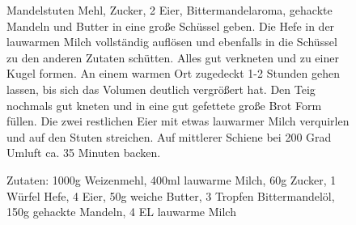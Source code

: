 \begin{figure}
Mandelstuten
Mehl, Zucker, 2 Eier, Bittermandelaroma, gehackte Mandeln und Butter in eine große Schüssel geben.
Die Hefe in der lauwarmen Milch vollständig auflösen und ebenfalls in die Schüssel zu den anderen Zutaten schütten. Alles gut verkneten und zu einer Kugel formen.
An einem warmen Ort zugedeckt 1-2 Stunden gehen lassen, bis sich das Volumen deutlich vergrößert hat.
Den Teig nochmals gut kneten und in eine gut gefettete große Brot Form füllen.
Die zwei restlichen Eier mit etwas lauwarmer Milch verquirlen und auf den Stuten streichen.
Auf mittlerer Schiene bei 200 Grad Umluft ca. 35 Minuten backen.

Zutaten: 1000g Weizenmehl, 400ml lauwarme Milch, 60g Zucker, 1 Würfel Hefe, 4 Eier, 50g weiche Butter, 3 Tropfen Bittermandelöl,
150g gehackte Mandeln, 4 EL lauwarme Milch
\end{figure}

